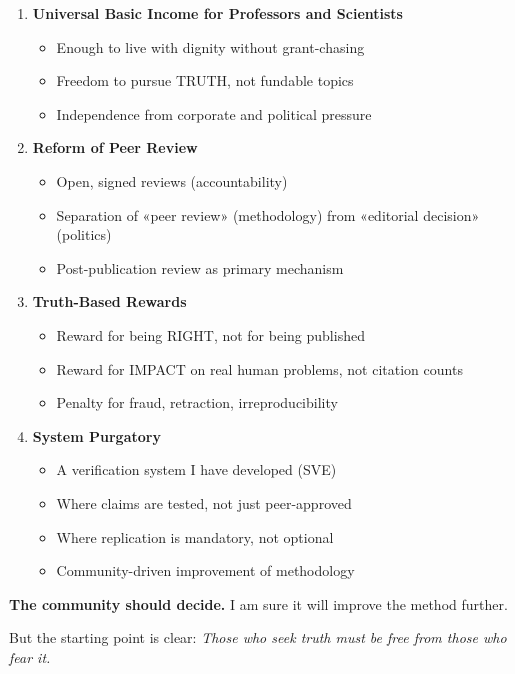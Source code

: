 \documentclass[11pt,a4paper]{article}
\theoremstyle{definition}
\theoremstyle{remark}
\begin{document}
\begin{enumerate}
\item \textbf{Universal Basic Income for Professors and Scientists}
\begin{itemize}
\item Enough to live with dignity without grant-chasing
\item Freedom to pursue TRUTH, not fundable topics
\item Independence from corporate and political pressure
\end{itemize}

\item \textbf{Reform of Peer Review}
\begin{itemize}
\item Open, signed reviews (accountability)
\item Separation of «peer review» (methodology) from «editorial decision» (politics)
\item Post-publication review as primary mechanism
\end{itemize}

\item \textbf{Truth-Based Rewards}
\begin{itemize}
\item Reward for being RIGHT, not for being published
\item Reward for IMPACT on real human problems, not citation counts
\item Penalty for fraud, retraction, irreproducibility
\end{itemize}

\item \textbf{System Purgatory}
\begin{itemize}
\item A verification system I have developed (SVE)
\item Where claims are tested, not just peer-approved
\item Where replication is mandatory, not optional
\item Community-driven improvement of methodology
\end{itemize}
\end{enumerate}

\textbf{The community should decide.} I am sure it will improve the method further.

But the starting point is clear: \textit{Those who seek truth must be free from those who fear it.}

\vspace{2em}
\end{document}
